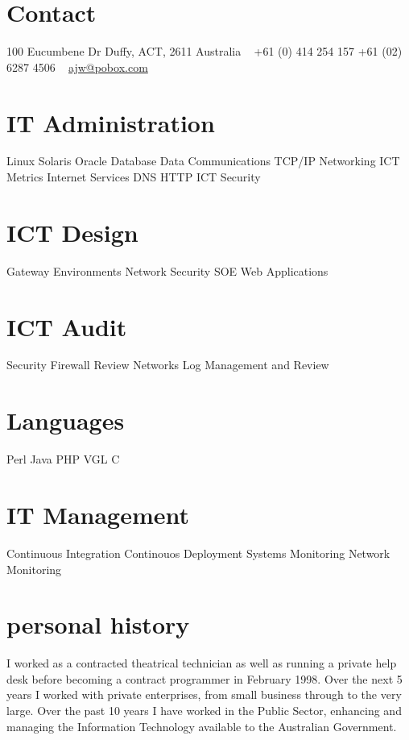 \documentclass[]{friggeri-cv} %
\begin{document}


\begin{aside} %
\section{Contact}
100 Eucumbene Dr
Duffy, ACT, 2611
Australia
~
+61 (0) 414 254 157
+61 (02) 6287 4506
~
\href{mailto:ajw@pobox.com}{ajw@pobox.com}
\section{IT Administration}
Linux
Solaris
Oracle Database
Data Communications
TCP/IP Networking
ICT Metrics
Internet Services
DNS
HTTP
ICT Security
\section{ICT Design}
Gateway Environments
Network
Security
SOE
Web Applications
\section{ICT Audit}
Security
Firewall Review
Networks
Log Management and Review
\section{Languages}
Perl
Java
PHP
VGL
C
\section{IT Management}
Continuous Integration
Continouos Deployment
Systems Monitoring
Network Monitoring
\end{aside}

\section{personal history}
I worked as a contracted theatrical technician as well as running a private help desk before becoming a contract programmer in February 1998. Over the next 5 years I worked with private enterprises, from small business through to the very large. Over the past 10 years I have worked in the Public Sector, enhancing and managing the Information Technology available to the Australian Government.
\end{document}
